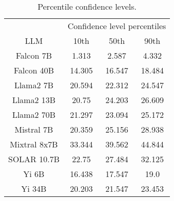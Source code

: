 \begin{table*}
\centering
\begin{tabular}{c|c|c|c}
& \multicolumn{3}{c}{Confidence level percentiles} \\ 
LLM & 10th & 50th & 90th\\ \hline
Falcon 7B & 1.313 & 2.587 & 4.332\\
Falcon 40B & 14.305 & 16.547 & 18.484\\
Llama2 7B & 20.594 & 22.312 & 24.547\\
Llama2 13B & 20.75 & 24.203 & 26.609\\
Llama2 70B & 21.297 & 23.094 & 25.172\\
Mistral 7B & 20.359 & 25.156 & 28.938\\
Mixtral 8x7B & 33.344 & 39.562 & 44.844\\
SOLAR 10.7B & 22.75 & 27.484 & 32.125\\
Yi 6B & 16.438 & 17.547 & 19.0\\
Yi 34B & 20.203 & 21.547 & 23.453\\
\hline
\end{tabular}
\caption{Percentile confidence levels.}
\label{tab:percentile_conf}
\end{table*}
